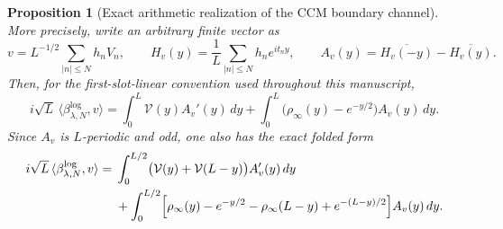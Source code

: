 \documentclass[11pt]{article}
\newtheorem{proposition}[theorem]{Proposition}
\theoremstyle{remark}
\begin{document}
\begin{proposition}[Exact arithmetic realization of the CCM boundary channel]
More precisely, write an arbitrary finite vector as
\[
 v=L^{-1/2}\sum_{|n|\le N}h_nV_n,
 \qquad
 H_v(y)=\frac1L\sum_{|n|\le N}h_ne^{it_ny},
 \qquad
 A_v(y)=\overline{H_v(-y)}-\overline{H_v(y)}.
\]
Then, for the first-slot-linear convention used throughout this manuscript,
\begin{equation}\label{eq:beta-arithmetic-trace}
 \boxed{
 i\sqrt L\,\langle\beta^{\log}_{\lambda,N},v\rangle
 =\int_0^L\mathcal V(y)A_v'(y)\,dy
  +\int_0^L\bigl(\rho_\infty(y)-e^{-y/2}\bigr)A_v(y)\,dy.}
\end{equation}
Since $A_v$ is $L$-periodic and odd, one also has the exact folded form
\begin{align}
 i\sqrt L\,\langle\beta^{\log}_{\lambda,N},v\rangle
 ={}&\int_0^{L/2}
   \bigl(\mathcal V(y)+\mathcal V(L-y)\bigr)A_v'(y)\,dy \notag\\
 &+\int_0^{L/2}
 \Bigl[
  \rho_\infty(y)-e^{-y/2}
  -\rho_\infty(L-y)+e^{-(L-y)/2}
 \Bigr]A_v(y)\,dy.                                      \label{eq:beta-arithmetic-folded}
\end{align}
\end{proposition}
\end{document}
